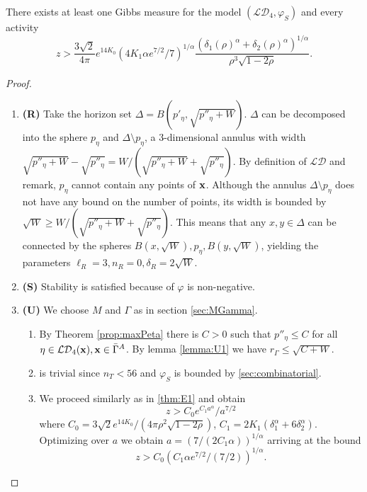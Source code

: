 \begin{theorem}\label{thm:E3}
	There exists at least one Gibbs measure for the model $(\mathcal {LD}_4,\varphi_S)$ and every activity 
	$$z> \frac{3\sqrt 2}{4\pi}e^{14 K_0}   (4K_1 \alpha e^{7/2}/7)^{1/\alpha} \frac{(\delta_1(\rho)^\alpha + \delta_2(\rho)^\alpha)^{1/\alpha}}{\rho^3 \sqrt{1-2\rho}}.$$
\end{theorem}
\begin{proof}
\begin{enumerate}[]
	\item \textbf{(R)} Take the horizon set $\Delta = B(p'_\eta, \sqrt{p''_\eta + W})$. $\Delta$ can be decomposed into the sphere $p_\eta$ and $\Delta \setminus p_\eta$, a 3-dimensional annulus with width $\sqrt{p''_\eta+W} -\sqrt{p''_\eta}=W/(\sqrt{p''_\eta+W} + \sqrt{p''_\eta})$. By definition of $\mathcal {LD}$ and remark, $p_\eta$  cannot contain any points of ${\mathbf{x}}$.  Although the annulus $\Delta \setminus p_\eta$ does not have any bound on the number of points, its width is bounded by $\sqrt W \geq  W/(\sqrt{p''_\eta+W} + \sqrt{p''_\eta})$. This means that any $x,y\in \Delta$ can be connected by the spheres $B(x,\sqrt W), p_\eta, B(y,\sqrt W)$, yielding the parameters $\ell_R = 3,n_R=0,\delta_R=2\sqrt W$.
	\item \textbf{(S)} Stability is satisfied because of $\varphi$ is non-negative.
	\item \textbf{(U)} We choose $M$ and $\Gamma$ as in section \ref{sec:MGamma}.
		\begin{enumerate}[(U1)]
			\item By Theorem \ref{prop:maxPeta} there is $C>0$ such that $p''_\eta\leq C$ for all $\eta \in \mathcal {LD}_4({\mathbf{x}}), {\mathbf{x}} \in \bar\Gamma^A$. By lemma \ref{lemma:U1} we have $r_\Gamma\leq \sqrt{C + W}$.
			\item is trivial since $n_T<56$ and $\varphi_{S}$ is bounded by \ref{sec:combinatorial}.
			\item We proceed similarly as in \ref{thm:E1} and obtain
				$$z>C_0 e^{C_1 a^\alpha} / a^{7/2}$$
				where $C_0=3 \sqrt 2 e^{14K_0} / (4\pi \rho^2 \sqrt{1-2\rho})$, $C_1 = 2K_1(\delta_1^\alpha + 6\delta_2^\alpha)$. Optimizing over $a$ we obtain $a=(7/(2C_1\alpha))^{1/\alpha}$ arriving at the bound
				$$z> C_0 (C_1 \alpha e^{7/2} / (7/2))^{1/\alpha}.$$
		\end{enumerate}
\end{enumerate}
\end{proof}



